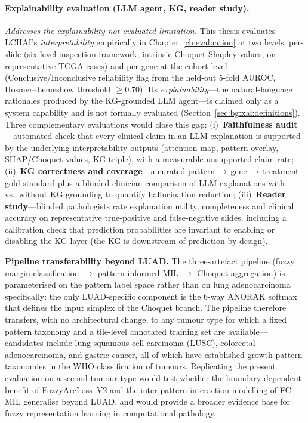\paragraph{Explainability evaluation (LLM agent, KG, reader
study).}
\emph{Addresses the explainability-not-evaluated limitation.}
This thesis evaluates LCHAI's \emph{interpretability}
empirically in Chapter~\ref{ch:evaluation} at two
levels: per-slide (six-level inspection framework, intrinsic
Choquet Shapley values, on representative TCGA cases) and
per-gene at the cohort level (Conclusive/Inconclusive
reliability flag from the held-out 5-fold AUROC, Hosmer--Lemeshow
threshold $\geq 0.70$).
Its \emph{explainability}---the natural-language rationales produced
by the KG-grounded LLM agent---is claimed only as a system
capability and is not formally evaluated
(Section~\ref{sec:bg:xai:definitions}).
Three complementary evaluations would close this gap:
(i)~\textbf{Faithfulness audit}---automated check that every
clinical claim in an LLM explanation is supported by the
underlying interpretability outputs (attention map, pattern
overlay, SHAP/Choquet values, KG triple), with a measurable
unsupported-claim rate;
(ii)~\textbf{KG correctness and coverage}---a curated
pattern\,$\to$\,gene\,$\to$\,treatment gold standard plus a
blinded clinician comparison of LLM explanations with vs.\ without
KG grounding to quantify hallucination reduction;
(iii)~\textbf{Reader study}---blinded pathologists rate
explanation utility, completeness and clinical accuracy on
representative true-positive and false-negative slides, including
a calibration check that prediction probabilities are invariant
to enabling or disabling the KG layer (the KG is downstream of
prediction by design).
 

\textbf{Pipeline transferability beyond LUAD.}
The three-artefact pipeline (fuzzy margin classification $\to$
pattern-informed MIL $\to$ Choquet aggregation) is parameterised
on the pattern label space rather than on lung adenocarcinoma
specifically: the only LUAD-specific component is the 6-way ANORAK
softmax that defines the input simplex of the Choquet branch.
The pipeline therefore transfers, with no architectural change, to
any tumour type for which a fixed pattern taxonomy and a
tile-level annotated training set are available---candidates
include lung squamous cell carcinoma (LUSC), colorectal
adenocarcinoma, and gastric cancer, all of which have
established growth-pattern taxonomies in the WHO classification
of tumours.
Replicating the present evaluation on a second tumour type would
test whether the boundary-dependent benefit of FuzzyArcLoss~V2 and
the inter-pattern interaction modelling of FC-MIL generalise
beyond LUAD, and would provide a broader evidence base for
fuzzy representation learning in computational pathology.

